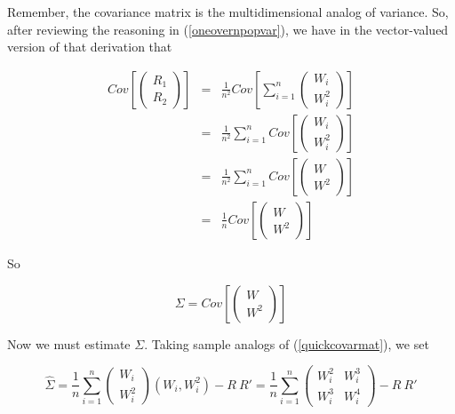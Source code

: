 Remember, the covariance matrix is the multidimensional analog of
variance.  So, after reviewing the reasoning in (\ref{oneovernpopvar}), 
we have in the vector-valued version of that derivation that

\begin{eqnarray}
Cov \left [
\left (
   \begin{array}{l}
   R_1 \\
   R_2 
   \end{array}
\right ) 
\right ]
&=& \frac{1}{n^2} 
Cov \left [
   \sum_{i=1}^n  
   \left (
      \begin{array}{l}
      W_i \\
      W_i^2 
      \end{array}
   \right ) 
\right ] \\
&=& \frac{1}{n^2} 
\sum_{i=1}^n  
   Cov \left [
   \left (
      \begin{array}{l}
      W_i \\
      W_i^2 
      \end{array}
   \right ) 
   \right ] \\
&=& \frac{1}{n^2} 
\sum_{i=1}^n  
   Cov \left [
   \left (
      \begin{array}{l}
      W \\
      W^2 
      \end{array}
   \right ) 
   \right ] \\
&=& \frac{1}{n} 
   Cov \left [
   \left (
      \begin{array}{l}
      W \\
      W^2 
      \end{array}
   \right ) 
   \right ] 
\end{eqnarray}

So

\begin{equation}
\Sigma = 
Cov \left [
\left (
   \begin{array}{l}
   W \\
   W^2 
   \end{array}
\right )
\right ]
\end{equation}

Now we must estimate $\Sigma$.  Taking sample analogs of
(\ref{quickcovarmat}), we set

\begin{equation}
\widehat{\Sigma} = 
\frac{1}{n}
\sum_{i=1}^n  
\left (
   \begin{array}{l}
   W_i \\
   W_i^2 
   \end{array}
\right ) 
(W_i,W_i^2) 
- R ~ R'
=
\frac{1}{n}
\sum_{i=1}^n  
\left (
   \begin{array}{ll}
   W_i^2 & W_i^3 \\
   W_i^3 & W_i^4 
   \end{array}
\right ) 
- R ~ R'
\end{equation}

